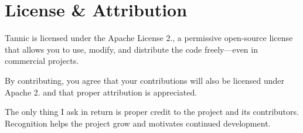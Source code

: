 \chapter{License \& Attribution}
\hypertarget{md_docs_2License}{}\label{md_docs_2License}
\label{md_docs_2License_autotoc_md80}%
%
 Tannic is licensed under the Apache License 2., a permissive open-\/source license that allows you to use, modify, and distribute the code freely—even in commercial projects.

By contributing, you agree that your contributions will also be licensed under Apache 2. and that proper attribution is appreciated.

The only thing I ask in return is proper credit to the project and its contributors. Recognition helps the project grow and motivates continued development. 